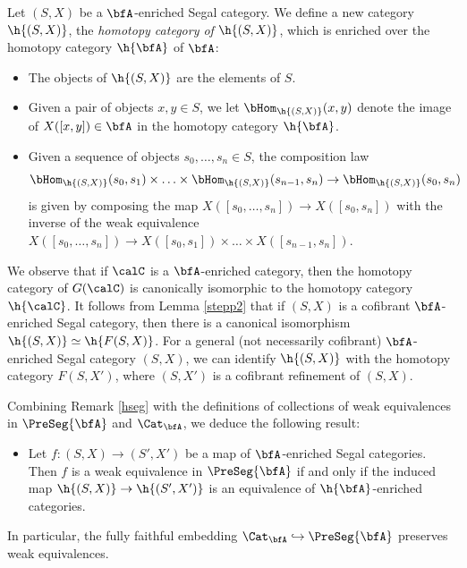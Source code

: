 \begin{remark}\label{hseg}
Let $(S,X)$ be a $\bfA$-enriched Segal category. We define a new category
$\h{(S,X)}$, the {\it homotopy category of $\h{(S,X)}$}, which is enriched over the homotopy
category $\h{\bfA}$ of $\bfA$:
\begin{itemize}
\item The objects of $\h{(S,X)}$ are the elements of $S$.
\item Given a pair of objects $x,y \in S$, we let $\bHom_{ \h{(S,X)} }(x,y)$ denote the
image of $X( [x,y] ) \in \bfA$ in the homotopy category $\h{\bfA}$.
\item Given a sequence of objects $s_0, \ldots, s_n \in S$, the composition law
$$ \bHom_{ \h{(S,X)}}( s_0, s_1) \times \ldots \times
\bHom_{ \h{(S,X)}}( s_{n-1}, s_n) \rightarrow \bHom_{ \h{(S,X)}}(s_0, s_n)$$
is given by composing the map $X( [s_0, \ldots, s_n]) \rightarrow X([s_0, s_n])$ with
the inverse of the weak equivalence $X( [s_0, \ldots, s_n] ) \rightarrow
X([ s_0, s_1]) \times \ldots \times X( [s_{n-1}, s_n]).$
\end{itemize} 

We observe that if $\calC$ is a $\bfA$-enriched category, then the homotopy category
of $G(\calC)$ is canonically isomorphic to the homotopy category $\h{\calC}$. 
It follows from Lemma \ref{stepp2} that if $(S,X)$ is a cofibrant $\bfA$-enriched Segal category,
then there is a canonical isomorphism $\h{(S,X)} \simeq \h{ F(S,X)}$. 
For a general (not necessarily cofibrant) $\bfA$-enriched Segal category $(S,X)$, we can
identify $\h{(S,X)}$ with the homotopy category $F(S, X')$, where $(S,X')$ is a cofibrant refinement of 
$(S,X)$.
\end{remark}

\begin{remark}\label{schwe}
Combining Remark \ref{hseg} with the definitions of collections of weak equivalences in
$\PreSeg{\bfA}$ and $\Cat_{\bfA}$, we deduce the following result:
\begin{itemize}
\item[$(\ast)$] Let $f: (S, X) \rightarrow (S', X')$ be a map of $\bfA$-enriched Segal categories.
Then $f$ is a weak equivalence in $\PreSeg{\bfA}$ if and only if the induced map
$\h{(S,X)} \rightarrow \h{(S',X')}$ is an equivalence of $\h{\bfA}$-enriched categories.
\end{itemize}
In particular, the fully faithful embedding $\Cat_{\bfA} \hookrightarrow \PreSeg{\bfA}$ preserves weak equivalences.
\end{remark}

